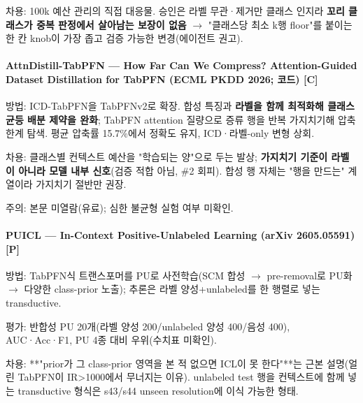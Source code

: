 \par\noindent \textbullet\enspace 차용: 100k 예산 관리의 직접 대응물. 승인은 라벨 무관·제거만 클래스 인지라 \textbf{꼬리 클래스가 중복 판정에서 살아남는 보장이 없음}  \ensuremath{\rightarrow}  "클래스당 최소 k행 floor"를 붙이는 한 칸 knob이 가장 좁고 검증 가능한 변경(에이전트 권고).


\paragraph{AttnDistill-TabPFN — How Far Can We Compress? Attention-Guided Dataset Distillation for TabPFN (ECML PKDD 2026; 코드) [C]}
\par\noindent \textbullet\enspace 방법: ICD-TabPFN을 TabPFNv2로 확장. 합성 특징과 \textbf{라벨을 함께 최적화해 클래스 균등 배분 제약을 완화}; TabPFN attention 질량으로 증류 행을 반복 가지치기해 압축 한계 탐색. 평균 압축률 15.7\%에서 정확도 유지, ICD·라벨-only 변형 상회.


\par\noindent \textbullet\enspace 차용: 클래스별 컨텍스트 예산을 "학습되는 양"으로 두는 발상; \textbf{가지치기 기준이 라벨이 아니라 모델 내부 신호}(검증 적합 아님, \#2 회피). 합성 행 자체는 "행을 만드는" 계열이라 가지치기 절반만 권장.


\par\noindent \textbullet\enspace 주의: 본문 미열람(유료); 심한 불균형 실험 여부 미확인.


\paragraph{PUICL — In-Context Positive-Unlabeled Learning (arXiv 2605.05591) [P]}
\par\noindent \textbullet\enspace 방법: TabPFN식 트랜스포머를 PU로 사전학습(SCM 합성  \ensuremath{\rightarrow}  pre-removal로 PU화  \ensuremath{\rightarrow}  다양한 class-prior 노출); 추론은 라벨 양성+\allowbreak{}unlabeled를 한 행렬로 넣는 transductive.


\par\noindent \textbullet\enspace 평가: 반합성 PU 20개(라벨 양성 200/\allowbreak{}unlabeled 양성 400/\allowbreak{}음성 400), AUC·Acc·F1, PU 4종 대비 우위(수치표 미확인).


\par\noindent \textbullet\enspace 차용: **"prior가 그 class-prior 영역을 본 적 없으면 ICL이 못 한다"**는 근본 설명(얼린 TabPFN이 IR>1000에서 무너지는 이유). unlabeled test 행을 컨텍스트에 함께 넣는 transductive 형식은 s43/\allowbreak{}s44 unseen resolution에 이식 가능한 형태.


